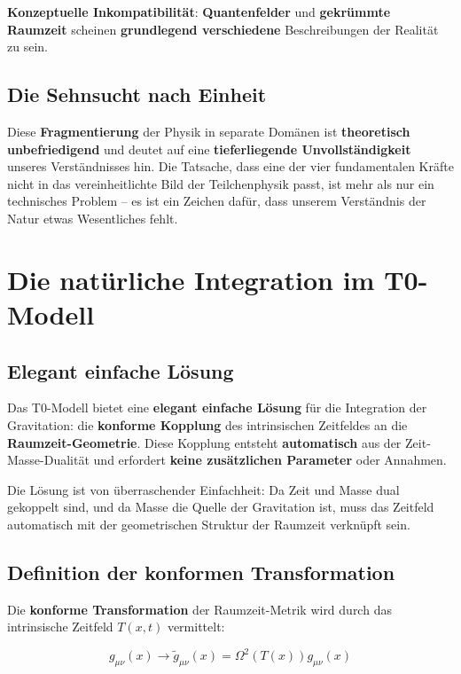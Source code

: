 \documentclass[12pt,a4paper]{report}
\begin{document}
\textbf{Konzeptuelle Inkompatibilität}: \textbf{Quantenfelder} und \textbf{gekrümmte Raumzeit} scheinen \textbf{grundlegend verschiedene} Beschreibungen der Realität zu sein.

\subsection{Die Sehnsucht nach Einheit}

Diese \textbf{Fragmentierung} der Physik in separate Domänen ist \textbf{theoretisch unbefriedigend} und deutet auf eine \textbf{tieferliegende Unvollständigkeit} unseres Verständnisses hin. Die Tatsache, dass eine der vier fundamentalen Kräfte nicht in das vereinheitlichte Bild der Teilchenphysik passt, ist mehr als nur ein technisches Problem -- es ist ein Zeichen dafür, dass unserem Verständnis der Natur etwas Wesentliches fehlt.

\section{Die natürliche Integration im T0-Modell}

\subsection{Elegant einfache Lösung}

Das T0-Modell bietet eine \textbf{elegant einfache Lösung} für die Integration der Gravitation: die \textbf{konforme Kopplung} des intrinsischen Zeitfeldes an die \textbf{Raumzeit-Geometrie}. Diese Kopplung entsteht \textbf{automatisch} aus der Zeit-Masse-Dualität und erfordert \textbf{keine zusätzlichen Parameter} oder Annahmen.

Die Lösung ist von überraschender Einfachheit: Da Zeit und Masse dual gekoppelt sind, und da Masse die Quelle der Gravitation ist, muss das Zeitfeld automatisch mit der geometrischen Struktur der Raumzeit verknüpft sein.

\subsection{Definition der konformen Transformation}

Die \textbf{konforme Transformation} der Raumzeit-Metrik wird durch das intrinsische Zeitfeld $T(x,t)$ vermittelt:

\begin{equation}
	g_{\mu\nu}(x) \to \tilde{g}_{\mu\nu}(x) = \Omega^2(T(x)) g_{\mu\nu}(x)
\end{equation}
\end{document}
